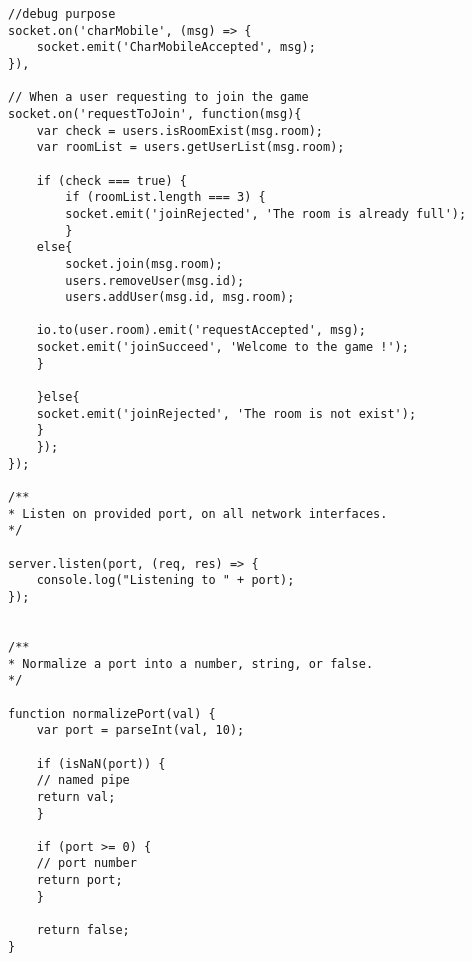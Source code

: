 \begin{lstlisting}
//debug purpose
socket.on('charMobile', (msg) => {
	socket.emit('CharMobileAccepted', msg);
}),

// When a user requesting to join the game
socket.on('requestToJoin', function(msg){
	var check = users.isRoomExist(msg.room);
	var roomList = users.getUserList(msg.room);

	if (check === true) {
		if (roomList.length === 3) {
		socket.emit('joinRejected', 'The room is already full');
		}
	else{
		socket.join(msg.room);
		users.removeUser(msg.id);
		users.addUser(msg.id, msg.room);

	io.to(user.room).emit('requestAccepted', msg);
	socket.emit('joinSucceed', 'Welcome to the game !');
	}

	}else{
	socket.emit('joinRejected', 'The room is not exist');
	}
	});
});

/**
* Listen on provided port, on all network interfaces.
*/

server.listen(port, (req, res) => {
	console.log("Listening to " + port);
});


/**
* Normalize a port into a number, string, or false.
*/

function normalizePort(val) {
	var port = parseInt(val, 10);

	if (isNaN(port)) {
	// named pipe
	return val;
	}

	if (port >= 0) {
	// port number
	return port;
	}

	return false;
}

\end{lstlisting}